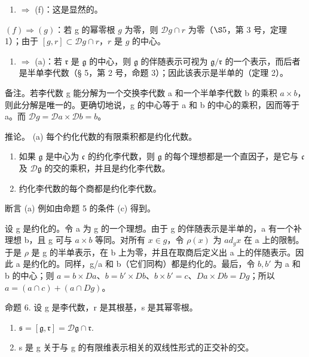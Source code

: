 \begin{enumerate}
\def\labelenumi{(\alph{enumi})}
\setcounter{enumi}{4}
\tightlist
\item
  \(\Rightarrow\) (f)：这是显然的。
\end{enumerate}

\((f) \Rightarrow (g)\)：若 g 的幂零根 \(g\) 为零，则 \(\mathcal{D}g \cap r\) 为零（\(\S 5\)，第 3 号，定理 1）；由于 \([g, r] \subset \mathcal{D}g \cap r\)，\(r\) 是 \(g\) 的中心。

\begin{enumerate}
\def\labelenumi{(\alph{enumi})}
\setcounter{enumi}{6}
\tightlist
\item
  \(\Rightarrow\) (a)：若 \(\mathfrak{r}\) 是 \(\mathfrak{g}\) 的中心，则 \(\mathfrak{g}\) 的伴随表示可视为 \(\mathfrak{g} / \mathfrak{r}\) 的一个表示，而后者是半单李代数（§ 5，第 2 号，命题 3）；因此该表示是半单的（定理 2）。
\end{enumerate}

备注。若李代数 g 能分解为一个交换李代数 a 和一个半单李代数 b 的乘积 \(a \times b\)，则此分解是唯一的。更确切地说，g 的中心等于 a 和 b 的中心的乘积，因而等于 a。而 \(\mathcal{D}g = \mathcal{D}a \times \mathcal{D}b = b\)。

推论。 (a) 每个约化代数的有限乘积都是约化代数。

\begin{enumerate}
\def\labelenumi{(\alph{enumi})}
\setcounter{enumi}{1}
\item
  如果 \(\mathfrak{g}\) 是中心为 \(\mathfrak{c}\) 的约化李代数，则 \(\mathfrak{g}\) 的每个理想都是一个直因子，是它与 \(\mathfrak{c}\) 及 \(\mathcal{D}\mathfrak{g}\) 的交的乘积，并且是约化李代数。
\item
  约化李代数的每个商都是约化李代数。
\end{enumerate}

断言 (a) 例如由命题 5 的条件 (c) 得到。

设 g 是约化的。令 a 为 g 的一个理想。由于 g 的伴随表示是半单的，a 有一个补理想 b，且 g 可与 \(a \times b\) 等同。对所有 \(x \in g\)，令 \(\rho(x)\) 为 \(ad_{g}x\) 在 a 上的限制。于是 \(\rho\) 是 g 的半单表示，在 b 上为零，并且在取商后定义出 a 上的伴随表示。因此 a 是约化的。同样，g/a 和 b（它们同构）都是约化的。最后，令 \(b, b'\) 为 a 和 b 的中心；则 \(a = b \times Da\)、\(b = b' \times Db\)、\(b \times b' = c\)、\(Da \times Db = Dg\)；所以 \(a = (a \cap c) + (a \cap Dg)\)。

命题 6. 设 g 是李代数，r 是其根基，s 是其幂零根。

\begin{enumerate}
\def\labelenumi{(\alph{enumi})}
\item
  \(\mathfrak{s} = [\mathfrak{g},\mathfrak{r}] = \mathcal{D}\mathfrak{g}\cap \mathfrak{r}.\)
\item
  s 是 g 关于与 g 的有限维表示相关的双线性形式的正交补的交。
\end{enumerate}

